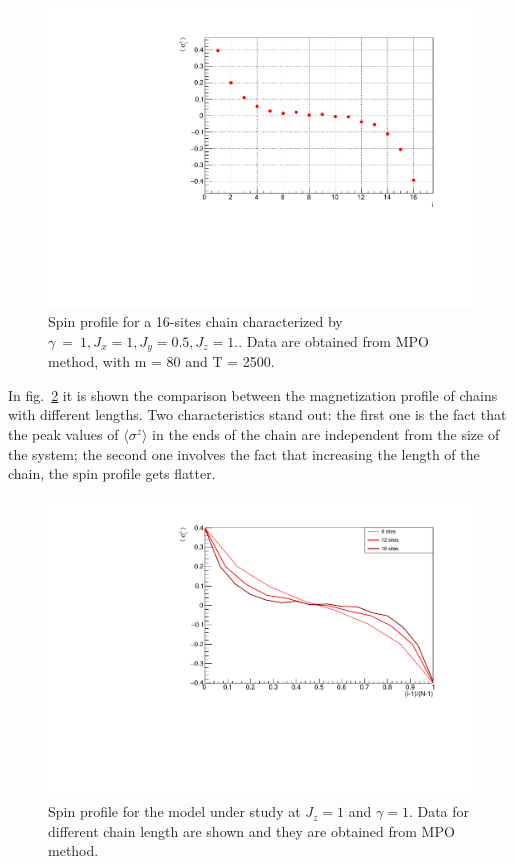 \begin{figure}[H]
    \centering
    \includegraphics[scale=0.7]{Figures/16sites/LML016m080Time002500_J1051.pdf}
    \caption{Spin profile for a 16-sites chain characterized by $\gamma~=~1, J_x=1, J_y=0.5, J_z=1.$. Data are obtained from MPO method, with m = 80 and T = 2500.}
    \label{fig:my_label}
\end{figure}



In fig.~\ref{fig:LM_comparisonVSsizeJz1Gamma1} it is shown the comparison between the magnetization profile of chains with different lengths. Two characteristics stand out: the first one is the fact that the peak values of $\langle\sigma^z\rangle$ in the ends of the chain are independent from the size of the system; the second one involves the fact that increasing the length of the chain, the spin profile gets flatter.

\begin{figure}[H]
    \centering
    \includegraphics[scale=0.7]{Figures/NORM_LM_comparisonVSsize.pdf}
    \caption{Spin profile for the model under study at $J_z = 1$ and $\gamma=1$. Data for different chain length are shown and they are obtained from MPO method.}
    \label{fig:LM_comparisonVSsizeJz1Gamma1}
\end{figure}

